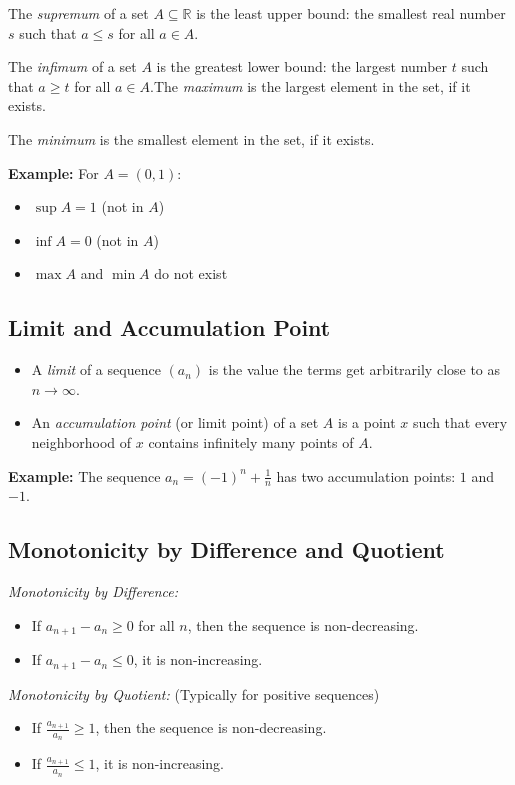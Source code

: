 The \emph{supremum} of a set \(A \subseteq \mathbb{R}\) is the least upper bound: the smallest real number \(s\) such that \(a \le s\) for all \(a \in A\).

The \emph{infimum} of a set \(A\) is the greatest lower bound: the largest number \(t\) such that \(a \ge t\) for all \(a \in A\).The \emph{maximum} is the largest element in the set, if it exists.

The \emph{minimum} is the smallest element in the set, if it exists.

\textbf{Example:} For \(A = (0,1)\):
\begin{itemize}[label=\(-\)]
\item \(\sup A = 1\) (not in \(A\))
\item \(\inf A = 0\) (not in \(A\))
\item \(\max A\) and \(\min A\) do not exist
\end{itemize}

\subsection{Limit and Accumulation Point}

\begin{itemize}[label=\(-\)]
\item A \emph{limit} of a sequence \((a_n)\) is the value the terms get arbitrarily close to as \(n \to \infty\).
\item An \emph{accumulation point} (or limit point) of a set \(A\) is a point \(x\) such that every neighborhood of \(x\) contains infinitely many points of \(A\).
\end{itemize}

\textbf{Example:} The sequence \(a_n = (-1)^n + \frac{1}{n}\) has two accumulation points: \(1\) and \(-1\).

\subsection{Monotonicity by Difference and Quotient}

\emph{Monotonicity by Difference:}
\begin{itemize}[label=\(-\)]
\item If \(a_{n+1} - a_n \ge 0\) for all \(n\), then the sequence is non-decreasing.
\item If \(a_{n+1} - a_n \le 0\), it is non-increasing.
\end{itemize}

\emph{Monotonicity by Quotient:} (Typically for positive sequences)
\begin{itemize}[label=\(-\)]
\item If \(\frac{a_{n+1}}{a_n} \ge 1\), then the sequence is non-decreasing.
\item If \(\frac{a_{n+1}}{a_n} \le 1\), it is non-increasing.
\end{itemize}

